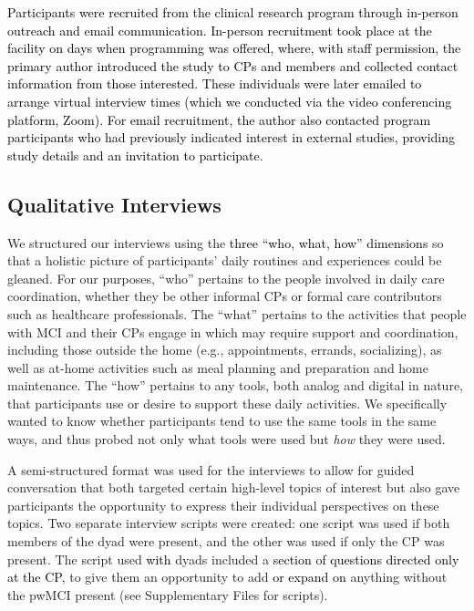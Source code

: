 \documentclass[acmsmall]{acmart}
\begin{document}
\textcolor{black}{Participants were recruited from the clinical research program through in-person outreach and email communication. In-person recruitment took place at the facility on \textcolor{black}{days when programming was offered}, where, with staff permission, the \textcolor{black}{primary} author introduced the study to CPs and members and collected contact information from those interested. These individuals were later emailed to arrange \textcolor{black}{virtual} interview times \textcolor{black}{(which we conducted via the video conferencing platform, Zoom)}. For email recruitment, the author also contacted program participants who had previously indicated interest in external studies, providing study details and an invitation to participate.}

\subsection{Qualitative Interviews}

We structured our interviews using the \textcolor{black}{three “who, what, how” dimensions} so that a holistic picture of participants’ daily routines and experiences could be gleaned. For our purposes, “who” pertains to the people involved in daily care coordination, whether they be other informal CPs or formal care contributors such as healthcare professionals. The “what” pertains to the activities that people with MCI and their CPs engage in which may require support and coordination, including those outside the home (e.g., appointments, errands, socializing), as well as at-home activities such as meal planning and preparation and home maintenance. The “how” pertains to any tools, both analog and digital in nature, that participants use or desire to support these daily activities. We specifically wanted to know whether participants tend to use the same tools in the same ways, and thus probed not only what tools were used but \textit{how} they were used.

A semi-structured format was used for the interviews to allow for guided conversation that both targeted certain high-level topics of interest but also gave participants the opportunity to express their individual perspectives on these topics. Two separate interview scripts were created: one script was used if both members of the dyad were present, and the other was used if only the CP was present. The script used \textcolor{black}{with} dyads included a \textcolor{black}{section of questions directed only at the CP, }to give them an opportunity to add \textcolor{black}{or expand on} anything without the pwMCI present (see Supplementary Files for scripts).
\end{document}
